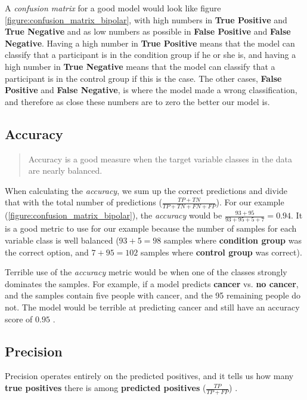 A \textit{confusion matrix} for a good model would look like figure \ref{figure:confusion_matrix_bipolar}, with high numbers in \textbf{True Positive} and \textbf{True Negative} and as low numbers as possible in \textbf{False Positive} and \textbf{False Negative}. Having a high number in \textbf{True Positive} means that the model can classify that a participant is in the condition group if he or she is, and having a high number in \textbf{True Negative} means that the model can classify that a participant is in the control group if this is the case. The other cases, \textbf{False Positive} and \textbf{False Negative}, is where the model made a wrong classification, and therefore as close these numbers are to zero the better our model is.

\subsection{Accuracy}

\blockquote[\cite{ml_metrics}]{Accuracy is a good measure when the target variable classes in the data are nearly balanced.}

When calculating the \textit{accuracy}, we sum up the correct predictions and divide that with the total number of predictions ($ \frac{TP + TN}{TP + TN + FN + FP} $). For our example (\ref{figure:confusion_matrix_bipolar}), the \textit{accuracy} would be $ \frac{93 + 95}{93 + 95 + 5 + 7} = 0.94 $. It is a good metric to use for our example because the number of samples for each variable class is well balanced ($ 93+5=98 $ samples where \textbf{condition group} was the correct option, and $ 7+95=102 $ samples where \textbf{control group} was correct).

Terrible use of the \textit{accuracy} metric would be when one of the classes strongly dominates the samples. For example, if a model predicts \textbf{cancer} vs. \textbf{no cancer}, and the samples contain five people with cancer, and the 95 remaining people do not. The model would be terrible at predicting cancer and still have an accuracy score of $ 0.95 $ \cite{ml_metrics}.

\subsection{Precision} 

Precision operates entirely on the predicted positives, and it tells us how many \textbf{true positives} there is among \textbf{predicted positives} ($ \frac{TP}{TP + FP} $) \cite{ml_metrics}. 

